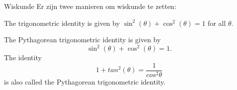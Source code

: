 \copyrightTim

\begin{frame}[fragile]{Wiskunde}
Er zijn twee manieren om wiskunde te zetten:

\begin{tcolorbox}[width=13cm, title={inline mode}, size=small]
    The trigonometric identity is given by $ \sin^2(\theta) + \cos^2(\theta) = 1 $ for all $ \theta $.
\end{tcolorbox}

 \begin{tcolorbox}[width=13cm, title={display mode}, size=small]
    The Pythagorean trigonometric identity is given by
    \begin{equation} \sin^2(\theta) + \cos^2(\theta) = 1. \end{equation}
    The identity
    \begin{equation} 1 + tan^2(\theta) = \frac{1}{cos^2\theta}\end{equation}
    is also called the Pythagorean trigonometric identity.

\end{tcolorbox}

\end{frame}
